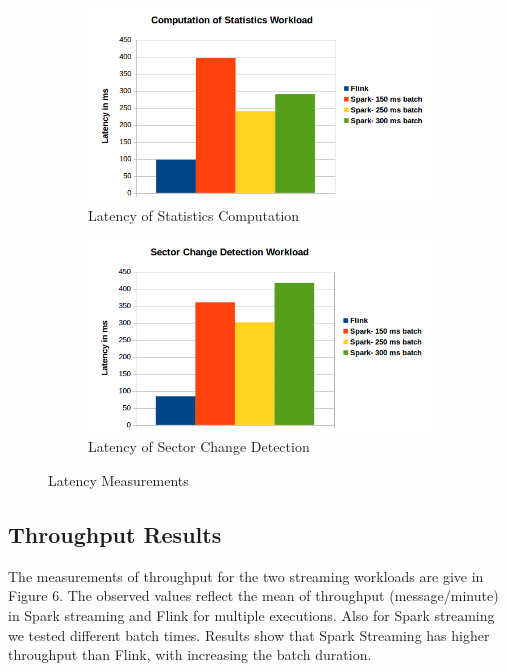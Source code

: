 \documentclass[]{article}
\begin{document}
\begin{figure}[h]
\begin{subfigure}{.5\textwidth}
  \centering
  \includegraphics[width=\linewidth]{latency1.png}
  \caption{Latency of Statistics Computation}

\end{subfigure}%
\begin{subfigure}{.5\textwidth}
  \centering
  \includegraphics[width=\linewidth]{latency2.png}
\caption{Latency of Sector Change Detection }

\end{subfigure}
\caption{Latency Measurements}
\label{fig:fig}
\end{figure}
\subsection{Throughput Results}

The  measurements of throughput for the two streaming workloads are give in Figure 6. The observed values reflect the mean of throughput (message/minute) 
 in Spark streaming and Flink for multiple executions. Also for Spark streaming we tested different 
 batch times. Results show that Spark Streaming has higher throughput than Flink, with increasing the batch duration.
\end{document}

